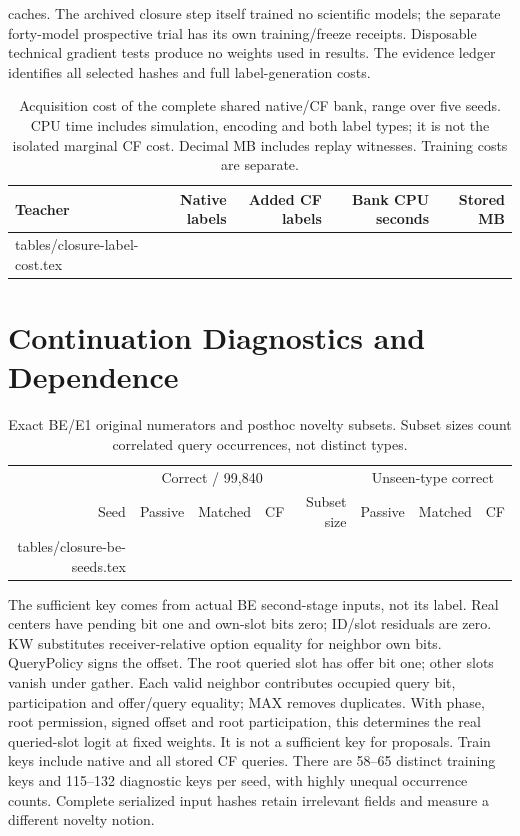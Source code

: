 \documentclass[10pt]{article}
\makeatletter
\let\closureinput\@@input
\makeatother
\begin{document}
caches. The archived closure step itself trained no scientific models;
the separate forty-model prospective trial has its own training/freeze
receipts. Disposable technical gradient
tests produce no weights used in results. The evidence ledger identifies
all selected hashes and full label-generation costs.
\begin{table}[htbp]\centering\small
\begin{tabular}{lrrrr}
\toprule Teacher & Native labels & Added CF labels & Bank CPU seconds & Stored MB \\
\midrule
\closureinput tables/closure-label-cost.tex
\bottomrule
\end{tabular}
\caption{Acquisition cost of the complete shared native/CF bank, range over
five seeds. CPU time includes simulation, encoding and both label types;
it is not the isolated marginal CF cost. Decimal MB includes replay witnesses.
Training costs are separate.}
\end{table}

\section{Continuation Diagnostics and Dependence}\label{app:cf}
\begin{table}[htbp]\centering\small
\begin{tabular}{rrrrrrrr}
\toprule & \multicolumn{3}{c}{Correct / 99,840} & & \multicolumn{3}{c}{Unseen-type correct} \\
Seed & Passive & Matched & CF & Subset size & Passive & Matched & CF \\
\midrule
\closureinput tables/closure-be-seeds.tex
\bottomrule
\end{tabular}
\caption{Exact BE/E1 original numerators and posthoc novelty subsets.
Subset sizes count correlated query occurrences, not distinct types.}
\end{table}
The sufficient key comes from actual BE second-stage inputs, not its label.
Real centers have pending bit one and own-slot bits zero; ID/slot residuals
are zero. KW substitutes receiver-relative option equality for neighbor own
bits. QueryPolicy signs the offset. The root queried slot has offer bit one;
other slots vanish under gather. Each valid neighbor contributes occupied
query bit, participation and offer/query equality; MAX removes duplicates.
With phase, root permission, signed offset and root participation, this
determines the real queried-slot logit at fixed weights. It is not a
sufficient key for proposals. Train keys include native and all stored CF
queries. There are 58--65 distinct training keys and 115--132 diagnostic keys
per seed, with highly unequal occurrence counts. Complete serialized input
hashes retain irrelevant fields and measure a different novelty notion.
\end{document}
